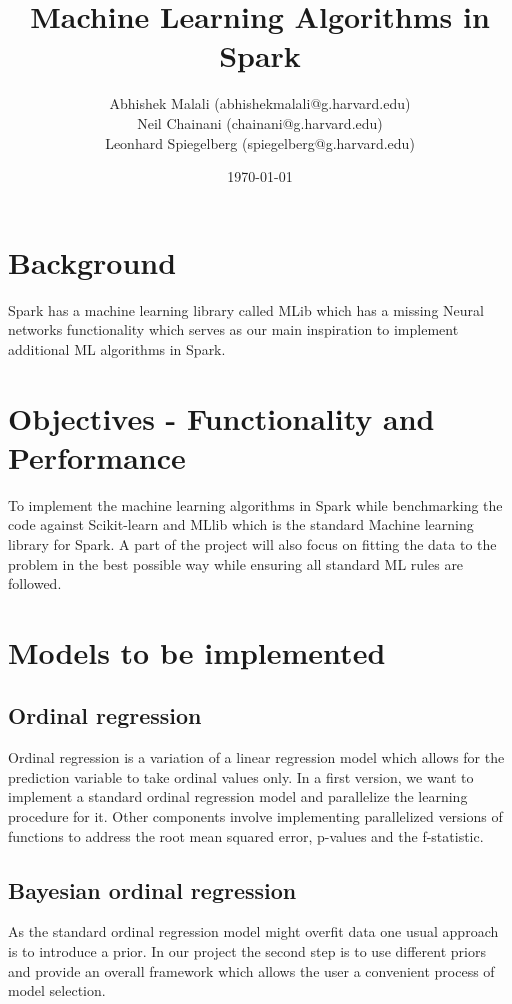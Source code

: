 \documentclass{article}
\begin{document}
	\title{Machine Learning Algorithms in Spark}
	\author{Abhishek Malali (abhishekmalali@g.harvard.edu)\\
			Neil Chainani (chainani@g.harvard.edu)\\
			Leonhard Spiegelberg (spiegelberg@g.harvard.edu)}
	\date{\today}
	\maketitle
	\section{Background}
	Spark has a machine learning library called MLib which has a missing Neural networks functionality which serves as our main inspiration to implement additional ML algorithms in Spark.


	\section{Objectives - Functionality and Performance}
	To implement the machine learning algorithms in Spark while benchmarking the code against Scikit-learn and MLlib which is the standard Machine learning library for Spark. A part of the project will also focus on fitting the data to the problem in the best possible way while ensuring all standard ML rules are followed.

	\section{Models to be implemented}
	\subsection{Ordinal regression}
	Ordinal regression is a variation of a linear regression model which allows for the prediction variable to take ordinal values only. In a first version, we want to implement a standard ordinal regression model and parallelize the learning procedure for it. Other components involve implementing parallelized versions of functions to address the root mean squared error, p-values and the f-statistic.
	\subsection{Bayesian ordinal regression}
	As the standard ordinal regression model might overfit data one usual approach is to introduce a prior. In our project the second step is to use different priors and provide an overall framework which allows the user a convenient process of model selection.
\end{document}
